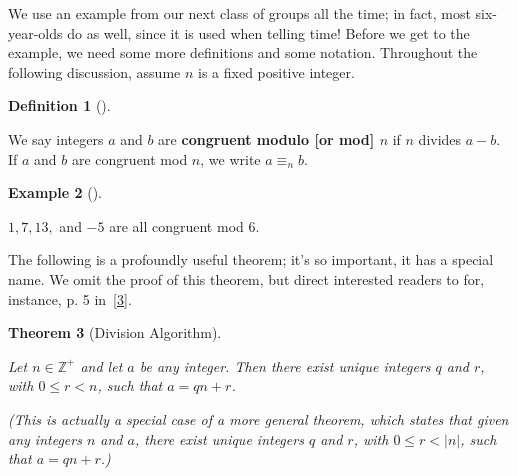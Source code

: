 \documentclass[10pt,]{book}
\newcommand{\terminology}[1]{\textbf{#1}}
\theoremstyle{plain}
\newtheorem{theorem}{Theorem}[section]
\theoremstyle{definition}
\newtheorem{definition}[theorem]{Definition}
\theoremstyle{definition}
\theoremstyle{definition}
\newtheorem{example}[theorem]{Example}
\theoremstyle{definition}
\numberwithin{equation}{section}
\def\Z{\mathbb{Z}}
\newcommand{\lt}{ < }
\begin{document}
    We use an example from our next class of groups all the time;
    in fact, most six-year-olds do as well, since it is used when
    telling time! Before we get to the example, we need some more
    definitions and some notation. Throughout the following discussion,
    assume \(n\) is a fixed positive integer.
\begin{definition}[{}]\label{definition-22}

        We say integers \(a\) and \(b\) are \terminology{congruent
        modulo [or mod] \(n\)} if \(n\) divides \(a-b\). If \(a\) and \(b\) are
        congruent mod \(n\), we write \(a \equiv_n b\).
\label{notation-40}
\end{definition}
\begin{example}[]\label{cong_ex}

        \(1, 7, 13,\) and \(-5\) are all congruent mod \(6\).
\end{example}
\par

    The following is a profoundly useful theorem; it's so
    important, it has a special name. We omit the proof of this theorem,
    but direct interested readers to for, instance, p. 5 in~\hyperlink{NZM}{[3]}.
\begin{theorem}[{Division Algorithm}]\label{divalg}


Let \(n\in \Z^+\) and let \(a\) be any
    integer. Then there exist unique integers \(q\) and \(r\), with \(0\leq
    r \lt n\), such that \(a=qn+r\).%
\par
(This is actually a special case
    of a more general theorem, which states that given any integers \(n\)
    and \(a\), there exist unique integers \(q\) and \(r\), with \(0\leq
    r\lt |n|\), such that \(a=qn+r\).)%
\end{theorem}
\par
\end{document}
